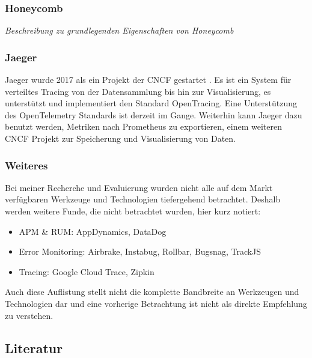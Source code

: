 \subsubsection{Honeycomb}

{\color{red}\textit{Beschreibung zu grundlegenden Eigenschaften von Honeycomb}}

\subsubsection{Jaeger}

Jaeger wurde 2017 als ein Projekt der CNCF gestartet \cite{Jaeger}. Es ist ein System für verteiltes Tracing von der Datensammlung bis hin zur Visualisierung, es unterstützt und implementiert den Standard OpenTracing.  Eine Unterstützung des OpenTelemetry Standards ist derzeit im Gange. Weiterhin kann Jaeger dazu benutzt werden, Metriken nach Prometheus \cite{Prometheus} zu exportieren, einem weiteren CNCF Projekt zur Speicherung und Visualisierung von Daten.

\subsubsection{Weiteres}

Bei meiner Recherche und Evaluierung wurden nicht alle auf dem Markt verfügbaren Werkzeuge und Technologien tiefergehend betrachtet. Deshalb werden weitere Funde, die nicht betrachtet wurden, hier kurz notiert:

\begin{itemize}
	\item APM \& RUM: AppDynamics, DataDog
	\item Error Monitoring: Airbrake, Instabug, Rollbar, Bugsnag, TrackJS
	\item Tracing: Google Cloud Trace, Zipkin
\end{itemize}

Auch diese Auflistung stellt nicht die komplette Bandbreite an Werkzeugen und Technologien dar und eine vorherige Betrachtung ist nicht als direkte Empfehlung zu verstehen.

\subsection{Literatur}